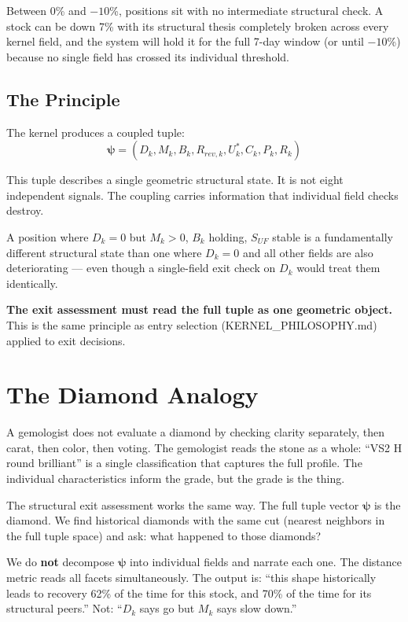 \documentclass[11pt, a4paper]{article}
\begin{document}
Between 0\% and $-10$\%, positions sit with no intermediate structural check.
A stock can be down 7\% with its structural thesis completely broken across
every kernel field, and the system will hold it for the full 7-day window
(or until $-10$\%) because no single field has crossed its individual threshold.

\subsection{The Principle}

The kernel produces a coupled tuple:
\[
  \boldsymbol{\psi} = (D_k, M_k, B_k, R_{rev,k}, U^*_k, C_k, P_k, R_k)
\]

This tuple describes a single geometric structural state. It is not eight
independent signals. The coupling carries information that individual field
checks destroy.

A position where $D_k = 0$ but $M_k > 0$, $B_k$ holding, $S_{UF}$ stable
is a fundamentally different structural state than one where $D_k = 0$ and
all other fields are also deteriorating --- even though a single-field exit
check on $D_k$ would treat them identically.

\textbf{The exit assessment must read the full tuple as one geometric object.}
This is the same principle as entry selection (KERNEL\_PHILOSOPHY.md) applied
to exit decisions.

\section{The Diamond Analogy}

A gemologist does not evaluate a diamond by checking clarity separately,
then carat, then color, then voting. The gemologist reads the stone as a
whole: ``VS2 H round brilliant'' is a single classification that captures
the full profile. The individual characteristics inform the grade, but the
grade is the thing.

The structural exit assessment works the same way. The full tuple vector
$\boldsymbol{\psi}$ is the diamond. We find historical diamonds with the
same cut (nearest neighbors in the full tuple space) and ask: what happened
to those diamonds?

We do \textbf{not} decompose $\boldsymbol{\psi}$ into individual fields
and narrate each one. The distance metric reads all facets simultaneously.
The output is: ``this shape historically leads to recovery 62\% of the time
for this stock, and 70\% of the time for its structural peers.'' Not:
``$D_k$ says go but $M_k$ says slow down.''
\end{document}
